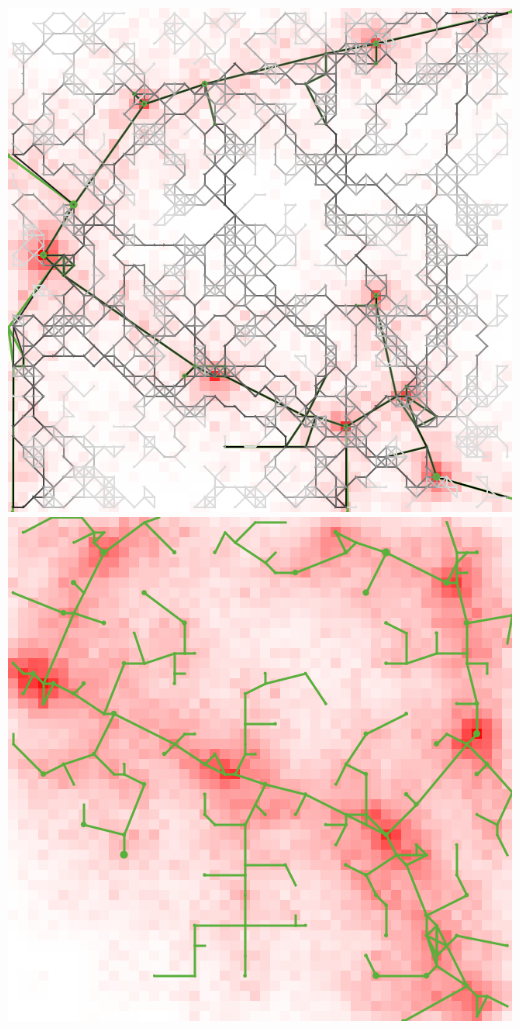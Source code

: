 \documentclass[english,11pt]{beamer}
\begin{document}
{\begin{columns}
\centering
\includegraphics[width=\textwidth]{figures/corr_example-bio-process-0}\hspace{0.1cm}\\
\includegraphics[width=\textwidth]{figures/corr_example-heuristic-0}




\end{columns}
}
\end{document}
